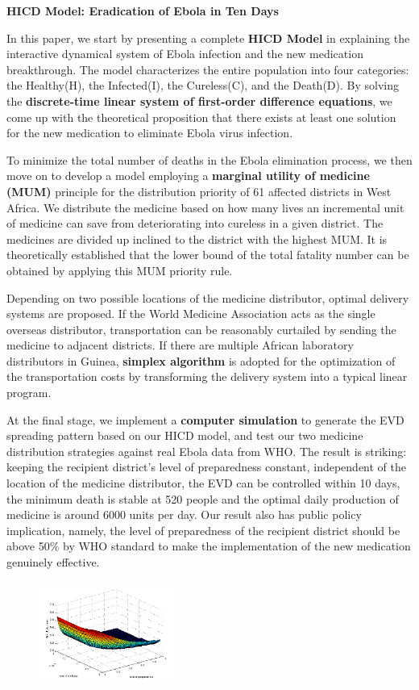\documentclass[a4paper]{article}
\begin{document}
\begin{center}
\textbf{HICD Model: Eradication of Ebola in Ten Days}
\end{center}
\setlength{\parindent}{0pt} \setlength{\parskip}{1.5ex plus 0.5ex
minus 0.2ex}
In this paper, we start by presenting a complete \textbf{HICD Model} in explaining the interactive dynamical system of Ebola infection and the new medication breakthrough. The model characterizes the entire population into four categories: the Healthy(H), the Infected(I), the Cureless(C), and the Death(D). By solving the \textbf{discrete-time linear system of first-order difference equations}, we come up with the theoretical proposition that there exists at least one solution for the new medication to eliminate Ebola virus infection.

To minimize the total number of deaths in the Ebola elimination process, we then move on to develop a model employing a \textbf{marginal utility of medicine (MUM)} principle for the distribution priority of 61 affected districts in West Africa. We distribute the medicine based on how many lives an incremental unit of medicine can save from deteriorating into cureless in a given district. The medicines are divided up inclined to the district with the highest MUM. It is theoretically established that the lower bound of the total fatality number can be obtained by applying this MUM priority rule.

Depending on two possible locations of the medicine distributor, optimal delivery systems are proposed. If the World Medicine Association acts as the single overseas distributor, transportation can be reasonably curtailed by sending the medicine to adjacent districts. If there are multiple African laboratory distributors in Guinea, \textbf{simplex algorithm} is adopted for the optimization of the transportation costs by transforming the delivery system into a typical linear program. 

At the final stage, we implement a \textbf{computer simulation} to generate the EVD spreading pattern based on our HICD model, and test our two medicine distribution strategies against real Ebola data from WHO. The result is striking: keeping the recipient district’s level of preparedness constant, independent of the location of the medicine distributor, the EVD can be controlled within 10 days, the minimum death is stable at 520 people and the optimal daily production of medicine is around 6000 units per day. Our result also has public policy implication, namely, the level of preparedness of the recipient district should be above 50\% by WHO standard to make the implementation of the new medication genuinely effective.

\begin{figure}[htbp]
  	\centering
      	\includegraphics[width=0.4\textwidth]{figures/imgpMedDeath1.png}
      	\label{figure_3dDeath1}
      	\label{figure_3d}
\end{figure}
\end{document}
